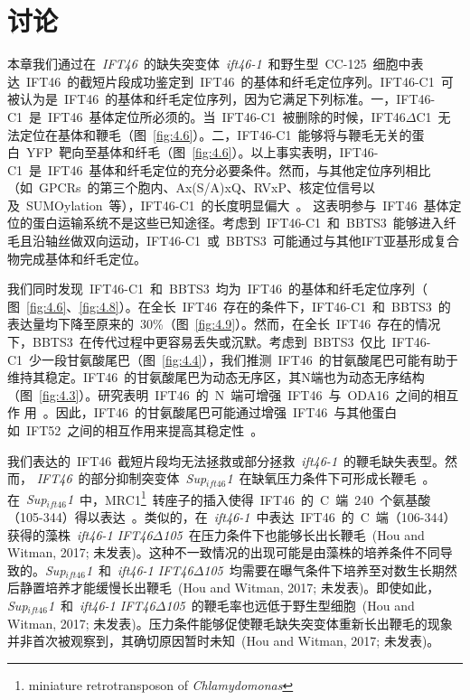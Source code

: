 \section{讨论}
本章我们通过在\ \textit{IFT46}\ 的缺失突变体\ \textit{ift46-1}\ 和野生型\ CC-125\ 细胞中表达\ IFT46\ 的截短片段成功鉴定到\ IFT46\ 的基体和纤毛定位序列。IFT46-C1\ 可被认为是\ IFT46\ 的基体和纤毛定位序列，因为它满足下列标准。一，IFT46-C1\ 是\ IFT46\ 基体定位所必须的。当\ IFT46-C1\ 被删除的时候，IFT46$\Delta$C1\ 无法定位在基体和鞭毛（图\ \ref{fig:4.6}）。二，IFT46-C1\ 能够将与鞭毛无关的蛋白\ YFP\ 靶向至基体和纤毛（图\ \ref{fig:4.6}）。以上事实表明，IFT46-C1\ 是\ IFT46\ 基体和纤毛定位的充分必要条件。然而，与其他定位序列相比（如\ GPCRs\ 的第三个胞内、Ax(S/A)xQ、RVxP、核定位信号以及\ SUMOylation\ 等），IFT46-C1\ 的长度明显偏大\
\citep{Malicki2014,Bhogaraju2013,McIntyre2015,Dishinger2010,Berbari2008,Hurd2011,Santos2014}。 这表明参与\ IFT46\ 基体定位的蛋白运输系统不是这些已知途径。考虑到\ IFT46-C1\ 和\ BBTS3\ 能够进入纤毛且沿轴丝做双向运动，IFT46-C1\ 或\ BBTS3\ 可能通过与其他IFT亚基形成复合物完成基体和纤毛定位。

我们同时发现\ IFT46-C1\ 和\ BBTS3\ 均为\ IFT46\ 的基体和纤毛定位序列（
图\ \ref{fig:4.6}、\ref{fig:4.8}）。在全长\ IFT46\ 存在的条件下，IFT46-C1\ 和\ BBTS3\ 的表达量均下降至原来的\ 30\%（图\ \ref{fig:4.9}）。然而，在全长\ IFT46\ 存在的情况下，BBTS3\ 在传代过程中更容易丢失或沉默。考虑到\ BBTS3\ 仅比\ IFT46-C1\ 少一段甘氨酸尾巴（图\ \ref{fig:4.4}），我们推测\ IFT46\ 的甘氨酸尾巴可能有助于维持其稳定。IFT46\ 的甘氨酸尾巴为动态无序区，其N端也为动态无序结构
（图\ \ref{fig:4.3}）。研究表明\ IFT46\ 的\ N\ 端可增强\ IFT46\ 与\ ODA16\ 之间的相互作
用\ \citep{Ahmed2008,Ahmed2005,Taschner2011,Hou2007}。因此，IFT46\ 的甘氨酸尾巴可能通过增强\ IFT46\ 与其他蛋白如\ IFT52\ 之间的相互作用来提高其稳定性\ \citep{Lv2017}。

我们表达的\ IFT46\ 截短片段均无法拯救或部分拯救\ \textit{ift46-1}\ 的鞭毛缺失表型。然而，
\textit{IFT46}\ 的部分抑制突变体\ \textit{Sup$_{ift46}$1}\ 在缺氧压力条件下可形成长鞭毛\ \citep{Hou2007}。在\ \textit{Sup$_{ift46}$1}\ 中，MRC1\footnote{miniature retrotransposon of \textit{Chlamydomonas}}\ 转座子的插入使得\ IFT46\ 的\ C\ 端\ 240\ 个氨基酸（105-344）得以表达\ \citep{Hou2007}。类似的，在\ \textit{ift46-1}\ 中表达\ IFT46\ 的\ C\ 端（106-344）获得的藻株\
\textit{ift46-1 IFT46$\Delta$105}\ 在压力条件下也能够长出长鞭毛\ (Hou and Witman, 2017; 未发表)。这种不一致情况的出现可能是由藻株的培养条件不同导致的。\textit{Sup$_{ift46}$1}\ 和\ \textit{ift46-1 IFT46$\Delta$105}\ 均需要在曝气条件下培养至对数生长期然后静置培养才能缓慢长出鞭毛\ (Hou and Witman, 2017; 未发表)。即使如此，
\textit{Sup$_{ift46}$1}\ 和\ \textit{ift46-1 IFT46$\Delta$105}\ 的鞭毛率也远低于野生型细胞\ (Hou and Witman, 2017; 未发表)。压力条件能够促使鞭毛缺失突变体重新长出鞭毛的现象并非首次被观察到，其确切原因暂时未知\ (Hou and Witman, 2017; 未发表)。


